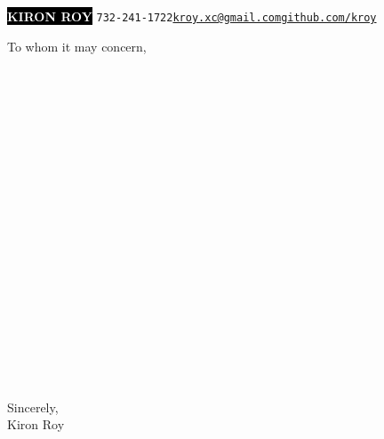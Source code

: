\documentclass[9pt]{developercv} %
\begin{document}
\begin{minipage}[t]{1\textwidth} %
    \vspace{-\baselineskip} %
    
    \colorbox{black}{{\HUGE\textcolor{white}{\textbf{\MakeUppercase{Kiron Roy}}}}} \hspace{.3 cm} \large\texttt{732-241-1722\slashsep\href{mailto:kroy.xc@gmail.com}{kroy.xc@gmail.com}\slashsep\href{https://github.com/kroy}{github.com/kroy}}
    
    \vspace{6pt}
    
\end{minipage}

\vspace{0.5cm}

\parbox{1\textwidth}{To whom it may concern,}\\
\vspace{0.5cm}\\
\parbox{1\textwidth}{\hspace{0.75cm}\lorem\lorem\lorem\lorem\lorem\lorem\lorem\lorem\lorem\lorem\lorem}\\
\vspace{0.25cm}\\
\parbox{1\textwidth}{\hspace{0.75cm}\lorem\lorem\lorem\lorem\lorem\lorem\lorem\lorem\lorem\lorem\lorem\lorem\lorem\lorem}\\
\vspace{0.25cm}\\
\parbox{1\textwidth}{\hspace{0.75cm}\lorem\lorem\lorem\lorem\lorem\lorem\lorem\lorem\lorem\lorem\lorem\lorem\lorem\lorem\lorem}\\
\vspace{0.25cm}\\
\parbox{1\textwidth}{\hspace{0.75cm}\lorem\lorem\lorem\lorem\lorem}\\
\vspace{0.25cm}\\
\parbox{1\textwidth}{\hspace{0.75cm}\lorem\lorem\lorem\lorem\lorem\lorem\lorem\lorem\lorem\lorem\lorem\lorem\lorem\lorem\lorem\lorem\lorem}\\
\vspace{0.25cm}\\
\parbox{1\textwidth}{\hspace{0.75cm}\lorem\lorem\lorem\lorem}\\
\vspace{0.5cm}\\

\parbox{1\textwidth}{Sincerely,\\Kiron Roy}
\end{document}
